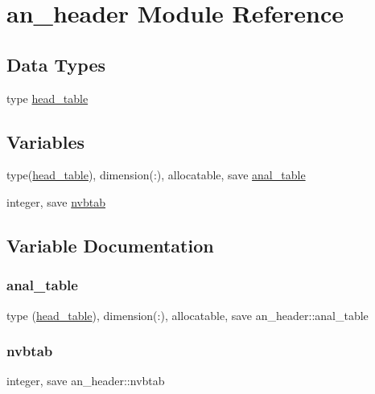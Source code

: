 \hypertarget{namespacean__header}{}\section{an\+\_\+header Module Reference}
\label{namespacean__header}
\subsection*{Data Types}
\begin{DoxyCompactItemize}
\item 
type \hyperlink{structan__header_1_1head__table}{head\+\_\+table}
\end{DoxyCompactItemize}
\subsection*{Variables}
\begin{DoxyCompactItemize}
\item 
type(\hyperlink{structan__header_1_1head__table}{head\+\_\+table}), dimension(\+:), allocatable, save \hyperlink{namespacean__header_ae5d3cd005b4f936e39d8ca9572fad953}{anal\+\_\+table}
\item 
integer, save \hyperlink{namespacean__header_a1f6702c906713337344986a86e036d55}{nvbtab}
\end{DoxyCompactItemize}


\subsection{Variable Documentation}
\mbox{\label{namespacean__header_ae5d3cd005b4f936e39d8ca9572fad953}} 
\subsubsection{\texorpdfstring{anal\+\_\+table}{anal\_table}}
{\footnotesize\ttfamily type (\hyperlink{structan__header_1_1head__table}{head\+\_\+table}), dimension(\+:), allocatable, save an\+\_\+header\+::anal\+\_\+table}

\mbox{\label{namespacean__header_a1f6702c906713337344986a86e036d55}} 
\subsubsection{\texorpdfstring{nvbtab}{nvbtab}}
{\footnotesize\ttfamily integer, save an\+\_\+header\+::nvbtab}

